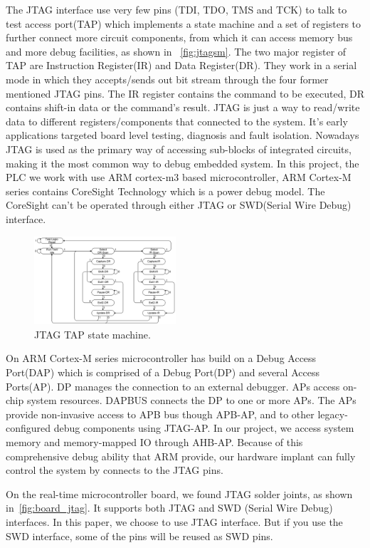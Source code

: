 The JTAG interface use very few pins (TDI, TDO, TMS and TCK) to talk to test access port(TAP) which implements a state machine and a set of registers to further connect more circuit components, from which it can access memory bus and more debug facilities, as shown in ~\autoref{fig:jtagsm}. The two major register of TAP are Instruction Register(IR) and Data Register(DR). They work in a serial mode in which they accepts/sends out bit stream through the four former mentioned JTAG pins. The IR register contains the command to be executed, DR contains shift-in data or the command's result. JTAG is just a way to read/write data to different registers/components that connected to the system. It's early applications targeted board level testing, diagnosis and fault isolation. Nowadays JTAG is used as the primary way of accessing sub-blocks of integrated circuits, making it the most common way to debug embedded system. In this project, the PLC we work with use ARM cortex-m3 based microcontroller, ARM Cortex-M series  contains CoreSight Technology which is a power debug model. The CoreSight can't be operated through either JTAG or SWD(Serial Wire Debug) interface.

\begin{figure}[th]
	\includegraphics[width=0.47\textwidth]{figures/jtagsm}
	\centering
	\caption{JTAG TAP state machine.}
	\label{fig:jtagsm}
\end{figure}


On ARM Cortex-M series microcontroller has build on a Debug Access Port(DAP) which is comprised of a Debug Port(DP) and several Access Ports(AP). DP manages the connection to an external debugger. APs access on-chip system resources. DAPBUS connects the DP to one or more APs. The APs provide non-invasive access to APB bus though APB-AP,  and to other legacy-configured debug components using JTAG-AP. In our project, we access system memory and memory-mapped IO through AHB-AP. Because of this comprehensive debug ability that ARM provide, our hardware implant can fully control the system by connects to the JTAG pins.

On the real-time microcontroller board, we found JTAG solder joints, as shown in~\autoref{fig:board_jtag}. It supports both JTAG and SWD (Serial Wire Debug\cite{ashfieldserial}) interfaces. In this paper, we choose to use JTAG interface. But if you use the SWD interface, some of the pins will be reused as SWD pins. 

